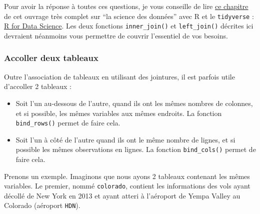 \documentclass[
  a4paper,
]{article}
\newenvironment{Shaded}{\begin{snugshade}}{\end{snugshade}}
\newcommand{\KeywordTok}[1]{\textcolor[rgb]{0.12,0.11,0.11}{\textbf{#1}}}
\newcommand{\NormalTok}[1]{\textcolor[rgb]{0.12,0.11,0.11}{#1}}
\newcommand{\OperatorTok}[1]{\textcolor[rgb]{0.12,0.11,0.11}{#1}}
\newcommand{\StringTok}[1]{\textcolor[rgb]{0.75,0.01,0.01}{#1}}
\providecommand{\tightlist}{%
  \setlength{\itemsep}{0pt}\setlength{\parskip}{0pt}}
\begin{document}
Pour avoir la réponse à toutes ces questions, je vous conseille de lire \href{http://r4ds.had.co.nz/relational-data.html}{ce chapitre} de cet ouvrage très complet sur ``la science des données'' avec R et le \texttt{tidyverse} : \href{http://r4ds.had.co.nz}{R for Data Science}. Les deux fonctions \texttt{inner\_join()} et \texttt{left\_join()} décrites ici devraient néanmoins vous permettre de couvrir l'essentiel de vos besoins.

\hypertarget{accoller-deux-tableaux}{%
\subsubsection{Accoller deux tableaux}\label{accoller-deux-tableaux}}

Outre l'association de tableaux en utilisant des jointures, il est parfois utile d'accoller 2 tableaux :

\begin{itemize}
\tightlist
\item
  Soit l'un au-dessous de l'autre, quand ils ont les mêmes nombres de colonnes, et si possible, les mêmes variables aux mêmes endroits. La fonction \texttt{bind\_rows()} permet de faire cela.
\item
  Soit l'un à côté de l'autre quand ils ont le même nombre de lignes, et si possible les mêmes observations en lignes. La fonction \texttt{bind\_cols()} permet de faire cela.
\end{itemize}

Prenons un exemple. Imaginons que nous ayons 2 tableaux contenant les mêmes variables. Le premier, nommé \texttt{colorado}, contient les informations des vols ayant décollé de New York en 2013 et ayant atteri à l'aéroport de Yempa Valley au Colorado (aéroport \texttt{HDN}).

\begin{Shaded}
\end{Shaded}
\end{document}
